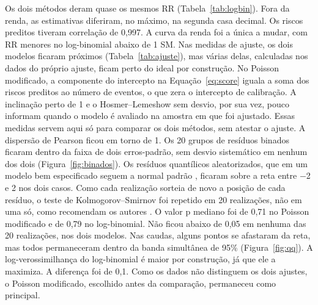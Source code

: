 \documentclass[12pt,a4paper]{article}
\newcommand{\tabela}[1]{\sbox\caixatabela{}%
  \ifdim\wd\caixatabela>\linewidth \resizebox{\linewidth}{!}{\usebox\caixatabela}%
  \else\ifdim\dimexpr\ht\caixatabela+\dp\caixatabela\relax>0.80\textheight
    \resizebox*{!}{0.80\textheight}{\usebox\caixatabela}%
  \else\usebox\caixatabela\fi\fi}
\begin{document}
Os dois métodos deram quase os mesmos RR (Tabela~\ref{tab:logbin}). Fora da renda, as estimativas diferiram, no máximo, na segunda casa decimal. Os riscos preditos tiveram correlação de 0,997. A curva da renda foi a única a mudar, com RR menores no log-binomial abaixo de 1 SM. Nas medidas de ajuste, os dois modelos ficaram próximos (Tabela~\ref{tab:ajuste}), mas várias delas, calculadas nos dados do próprio ajuste, ficam perto do ideal por construção. No Poisson modificado, a componente do intercepto na Equação~\eqref{eq:score} iguala a soma dos riscos preditos ao número de eventos, o que zera o intercepto de calibração. A inclinação perto de 1 e o Hosmer--Lemeshow sem desvio, por sua vez, pouco informam quando o modelo é avaliado na amostra em que foi ajustado. Essas medidas servem aqui só para comparar os dois métodos, sem atestar o ajuste. A dispersão de Pearson ficou em torno de 1. Os 20 grupos de resíduos binados ficaram dentro da faixa de dois erros-padrão, sem desvio sistemático em nenhum dos dois (Figura~\ref{fig:binados}). Os resíduos quantílicos aleatorizados, que em um modelo bem especificado seguem a normal padrão \citep[pp.~238--239]{dunn1996randomized}, ficaram sobre a reta entre $-$2 e 2 nos dois casos. Como cada realização sorteia de novo a posição de cada resíduo, o teste de Kolmogorov--Smirnov foi repetido em 20 realizações, não em uma só, como recomendam os autores \citep[p.~243]{dunn1996randomized}. O valor p mediano foi de 0,71 no Poisson modificado e de 0,79 no log-binomial. Não ficou abaixo de 0,05 em nenhuma das 20 realizações, nos dois modelos. Nas caudas, alguns pontos se afastaram da reta, mas todos permaneceram dentro da banda simultânea de 95\% (Figura~\ref{fig:qq}). A log-verossimilhança do log-binomial é maior por construção, já que ele a maximiza. A diferença foi de 0,1. Como os dados não distinguem os dois ajustes, o Poisson modificado, escolhido antes da comparação, permaneceu como principal.

\begin{table}[H]
  \centering
  \caption[Risco relativo pelo Poisson modificado e pelo modelo log-binomial]{RR do modelo principal estimados pela regressão de Poisson modificada e pelo modelo log-binomial, ambos com variância HC3. Na renda, RR em relação à mediana (2,25 SM) em três pontos da curva; testes globais na Tabela~\ref{tab:sensibilidade}.}
  \label{tab:logbin}
  \tabela{tab_tcc_logbin.tex}
\end{table}

\begin{table}[H]
  \centering
  \caption[Medidas de ajuste dos dois modelos]{Medidas de ajuste dos dois modelos, todas calculadas na amostra do ajuste. Log-verossimilhança e escore de Brier \citep[p.~368]{harrell1996multivariable} calculados com a verossimilhança de Bernoulli; Hosmer--Lemeshow com 10 grupos pelo risco predito \citep{hosmer1997comparison}; calibração pela regressão logística do desfecho no logit do risco predito; resíduos quantílicos comparados à normal padrão pelo teste de Kolmogorov--Smirnov, com o valor p mediano (mínimo--máximo) de 20 realizações.}
  \label{tab:ajuste}
  \tabela{tab_tcc_ajuste.tex}
\end{table}
\end{document}
